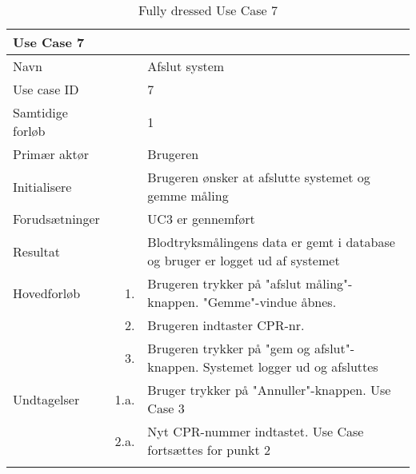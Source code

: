 \begin{longtabu} to  %
    {\large \textbf{Use Case 7}} && \\
    \toprule
    Navn &&    Afslut system\\
    Use case ID &&    7\\
    Samtidige forløb &&    1\\
    Primær aktør &&    Brugeren\\
    Initialisere &&    Brugeren ønsker at afslutte systemet og gemme måling\\
    Forudsætninger && UC3 er gennemført\\
    Resultat &&    Blodtryksmålingens data er gemt i database og bruger er logget ud af systemet                    \\ \midrule
    Hovedforløb &    1. &    Brugeren trykker på "afslut måling"\--knappen. "Gemme"\--vindue åbnes. \\  						 	
                &    2. & Brugeren indtaster CPR-nr. 	\\
                &    3. & Brugeren trykker på "gem og afslut"\--knappen. Systemet logger ud og afsluttes\\ \midrule                
    Undtagelser &    1.a. & Bruger trykker på "Annuller"\--knappen. Use Case 3 \\ 
    			&	2.a. &  Nyt CPR-nummer indtastet. Use Case fortsættes for punkt 2\\ \bottomrule
    		
\caption{Fully dressed Use Case 7}
\label{UC7}
\end{longtabu}





















